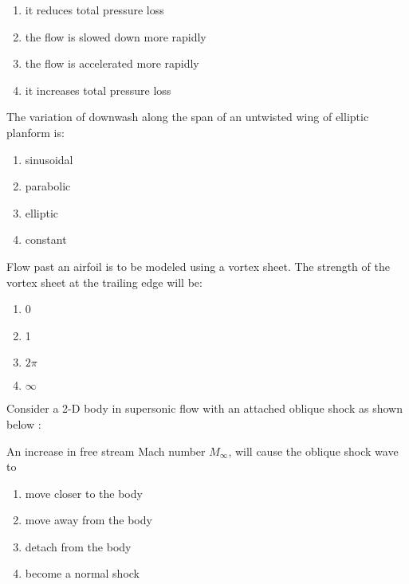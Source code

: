 \begin{enumerate}
    \item it reduces total pressure loss
    \item the flow is slowed down more rapidly
    \item the flow is accelerated more rapidly
    \item it increases total pressure loss
\end{enumerate}
\item The variation of downwash along the span of an untwisted wing of elliptic planform is:
\begin{enumerate}
    \item sinusoidal
    \item parabolic
    \item elliptic
    \item constant
\end{enumerate}
\item Flow past an airfoil is to be modeled using a vortex sheet. The strength of the vortex sheet at the trailing edge will be:
\begin{enumerate}
    \item 0
    \item 1
    \item $2\pi$
    \item $\infty$
\end{enumerate}
\item Consider a 2-D body in supersonic flow with an attached oblique shock as shown below :
\begin{figure}[!ht]
\centering
{}%

\label{fig:my_label}
\end{figure}
An increase in free stream Mach number $M_\infty$, will cause the oblique shock wave to
\begin{enumerate}
    \item move closer to the body
    \item move away from the body
    \item detach from the body
    \item become a normal shock
\end{enumerate}


